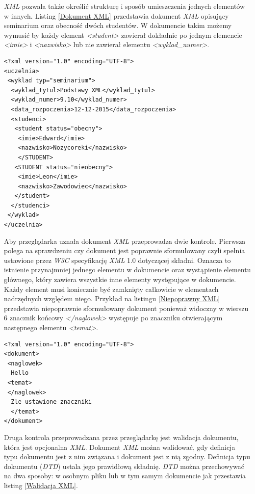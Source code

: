 \documentclass{iiuwb}
\begin{document}
\textit{XML} pozwala także określić strukturę i sposób umieszczenia jednych elementów w innych. 
Listing \ref{Dokument XML} przedstawia dokument \textit{XML} opisujący seminarium oraz obecność dwóch studentów. W dokumencie takim możemy wymusić by każdy element \textit{<student>} zawierał dokładnie po jednym elemencie \textit{<imie>} i \textit{<nazwisko>} lub nie zawierał elementu \textit{<wyklad\_numer>}.
\begin{lstlisting}[label=Dokument XML, caption=Przykładowy dokument XML]
<?xml version="1.0" encoding="UTF-8">
<uczelnia>
 <wyklad typ="seminarium">
  <wyklad_tytul>Podstawy XML</wyklad_tytul>	
  <wyklad_numer>9.10</wyklad_numer>
  <data_rozpoczenia>12-12-2015</data_rozpoczenia>
  <studenci>
   <student status="obecny">
    <imie>Edward</imie>
    <nazwisko>Nozycoreki</nazwisko>
    </STUDENT>
   <STUDENT status="nieobecny">
    <imie>Leon</imie>
    <nazwisko>Zawodowiec</nazwisko>
   </student>
  </studenci>
 </wyklad>
</uczelnia>
\end{lstlisting}

Aby przeglądarka uznała dokument \textit{XML} przeprowadza dwie kontrole. Pierwsza polega na sprawdzeniu czy dokument jest poprawnie sformułowany czyli spełnia ustawione przez \textit{W3C} specyfikację \textit{XML} 1.0 dotyczącej składni. Oznacza to istnienie przynajmniej jednego elementu w dokumencie oraz wystąpienie elementu głównego, który zawiera wszystkie inne elementy występujące w dokumencie. Każdy element musi koniecznie być zamknięty całkowicie w elementach nadrzędnych względem niego. Przykład na listingu  \ref{Niepoprawny XML} przedstawia niepoprawnie sformułowany dokument ponieważ widoczny w wierszu 6 znacznik końcowy \textit{</naglowek>} występuje po znaczniku otwierającym następnego elementu \textit{<temat>}.
\begin{lstlisting}[label=Niepoprawny XML, caption=Niepoprawnie sformułowany dokument XML]
<?xml version="1.0" encoding="UTF-8">
<dokument>
 <naglowek>
  Hello
 <temat>
 </naglowek>
  Zle ustawione znaczniki
  </temat>
</dokument>
\end{lstlisting}

Druga kontrola przeprowadzana przez przeglądarkę jest walidacja dokumentu, która jest opcjonalna \textit{XML}. Dokument \textit{XML} można walidować, gdy definicja typu dokumentu jest z nim związana i dokument jest z nią zgodny. Definicja typu dokumentu (\textit{DTD}) ustala jego prawidłową składnię. \textit{DTD} można przechowywać na dwa sposoby: w osobnym pliku lub w tym samym dokumencie jak przestawia listing \ref{Walidacja XML}. 
\end{document}
